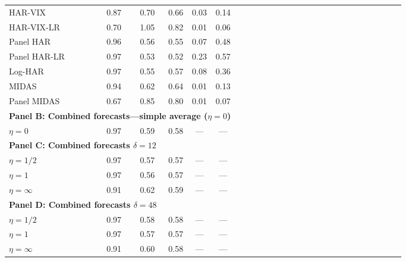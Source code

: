 \begin{tabular}{llccccccccccccccccccccccccc}
\multicolumn{2}{l}{HAR-VIX} & 0.87 & 0.70 & 0.66 & 0.03 & 0.14\\ 
\multicolumn{2}{l}{HAR-VIX-LR} & 0.70 & 1.05 & 0.82 & 0.01 & 0.06\\ 
\multicolumn{2}{l}{Panel HAR} & 0.96 & 0.56 & 0.55 & 0.07 & 0.48\\ 
\multicolumn{2}{l}{Panel HAR-LR} & 0.97 & 0.53 & 0.52 & 0.23 & 0.57\\ 
\midrule 
\multicolumn{2}{l}{Log-HAR} & 0.97 & 0.55 & 0.57 & 0.08 & 0.36\\ 
\midrule 
\multicolumn{2}{l}{MIDAS} & 0.94 & 0.62 & 0.64 & 0.01 & 0.13\\ 
\multicolumn{2}{l}{Panel MIDAS} & 0.67 & 0.85 & 0.80 & 0.01 & 0.07\\ 
\midrule 
\multicolumn{7}{l}{\textbf{Panel B: Combined forecasts---simple average ($\eta = 0$)}} \\ \midrule 
 $\eta = 0$ &  & 0.97 & 0.59 & 0.58 & --- & --- \\ 
\midrule 
\multicolumn{4}{l}{\textbf{Panel C: Combined forecasts $\delta = 12$}} \\ \midrule 
 $\eta = 1/2$  & & 0.97 & 0.57 & 0.57 & --- & --- \\ 
 $\eta = 1$  & & 0.97 & 0.56 & 0.57 & --- & --- \\ 
 $\eta = \infty$ & & 0.91 & 0.62 & 0.59 & --- & --- \\ 
\midrule 
\multicolumn{4}{l}{\textbf{Panel D: Combined forecasts $\delta = 48$}} \\ \midrule 
 $\eta = 1/2$  & & 0.97 & 0.58 & 0.58 & --- & --- \\ 
 $\eta = 1$  & & 0.97 & 0.57 & 0.57 & --- & --- \\ 
 $\eta = \infty$ & & 0.91 & 0.60 & 0.58 & --- & --- \\ 
\bottomrule 
\end{tabular}
